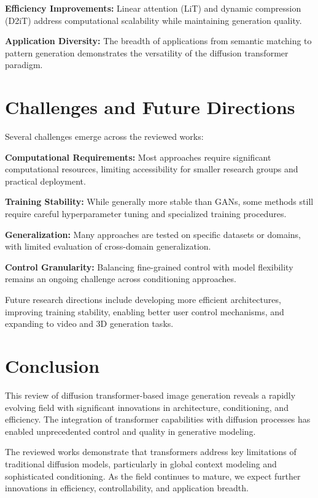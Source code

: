 \documentclass[a4paper]{article}
\begin{document}
\textbf{Efficiency Improvements:} Linear attention (LiT) and dynamic compression (D2iT) address computational scalability while maintaining generation quality.

\textbf{Application Diversity:} The breadth of applications from semantic matching to pattern generation demonstrates the versatility of the diffusion transformer paradigm.

\section{Challenges and Future Directions}

Several challenges emerge across the reviewed works:

\textbf{Computational Requirements:} Most approaches require significant computational resources, limiting accessibility for smaller research groups and practical deployment.

\textbf{Training Stability:} While generally more stable than GANs, some methods still require careful hyperparameter tuning and specialized training procedures.

\textbf{Generalization:} Many approaches are tested on specific datasets or domains, with limited evaluation of cross-domain generalization.

\textbf{Control Granularity:} Balancing fine-grained control with model flexibility remains an ongoing challenge across conditioning approaches.

Future research directions include developing more efficient architectures, improving training stability, enabling better user control mechanisms, and expanding to video and 3D generation tasks.

\section{Conclusion}

This review of diffusion transformer-based image generation reveals a rapidly evolving field with significant innovations in architecture, conditioning, and efficiency. The integration of transformer capabilities with diffusion processes has enabled unprecedented control and quality in generative modeling.

The reviewed works demonstrate that transformers address key limitations of traditional diffusion models, particularly in global context modeling and sophisticated conditioning. As the field continues to mature, we expect further innovations in efficiency, controllability, and application breadth.
\end{document}
